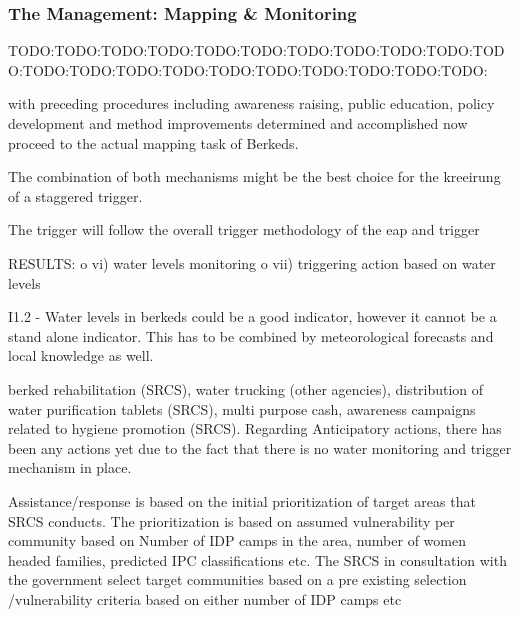 







\subsubsection{The Management: Mapping \& Monitoring}
TODO:TODO:TODO:TODO:TODO:TODO:TODO:TODO:TODO:TODO:TODO:TODO:TODO:TODO:TODO:TODO:TODO:TODO:TODO:TODO:TODO:

with preceding procedures including awareness raising, public education, policy development and method improvements determined and accomplished now proceed to the actual mapping task of Berkeds.


The combination of both mechanisms might be the best choice for the kreeirung of a staggered trigger.

The trigger will follow the overall trigger methodology of the \acrshort{eap} and 
trigger

RESULTS:
o	vi) water levels monitoring
o	vii) triggering action based on water levels




I1.2
-	Water levels in berkeds could be a good indicator, however it cannot be a stand alone indicator. This has to be combined by meteorological forecasts and local knowledge as well.



berked rehabilitation (SRCS), water trucking (other agencies), distribution of water purification tablets (SRCS), multi purpose cash, awareness campaigns related to hygiene promotion (SRCS). Regarding Anticipatory actions, there has been any actions yet due to the fact that there is no water monitoring and trigger mechanism in place.

Assistance/response is based on the initial prioritization of target areas that SRCS conducts. The prioritization is based on assumed vulnerability per community based on Number of IDP camps in the area, number of women headed families, predicted IPC classifications etc.
The SRCS in consultation with the government select target communities based on a pre existing selection /vulnerability criteria based on either number of IDP camps etc


